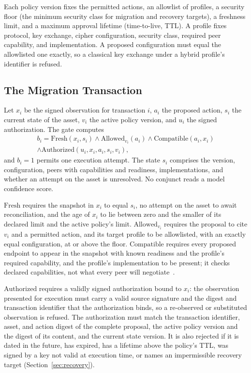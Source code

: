 \documentclass[journal]{IEEEtran}
\newcommand{\Fresh}{\mathrm{Fresh}}
\newcommand{\Allowed}{\mathrm{Allowed}}
\newcommand{\Compatible}{\mathrm{Compatible}}
\newcommand{\Authorized}{\mathrm{Authorized}}
\begin{document}
Each policy version fixes the permitted actions, an allowlist of profiles, a security floor (the minimum security class for migration and recovery targets), a freshness limit, and a maximum approval lifetime (time-to-live, TTL). A profile fixes protocol, key exchange, cipher configuration, security class, required peer capability, and implementation. A proposed configuration must equal the allowlisted one exactly, so a classical key exchange under a hybrid profile's identifier is refused.

\subsection{The Migration Transaction}
\label{sec:txn}
Let $x_i$ be the signed observation for transaction $i$, $a_i$ the proposed action, $s_i$ the current state of the asset, $v_i$ the active policy version, and $u_i$ the signed authorization. The gate computes
\begin{multline}
\label{eq:gate}
b_i = \Fresh(x_i,s_i) \wedge \Allowed_{v_i}(a_i) \wedge \Compatible(a_i,x_i) \\
\wedge \Authorized(u_i,x_i,a_i,s_i,v_i),
\end{multline}
and $b_i=1$ permits one execution attempt. The state $s_i$ comprises the version, configuration, peers with capabilities and readiness, implementations, and whether an attempt on the asset is unresolved. No conjunct reads a model confidence score.

$\Fresh$ requires the snapshot in $x_i$ to equal $s_i$, no attempt on the asset to await reconciliation, and the age of $x_i$ to lie between zero and the smaller of its declared limit and the active policy's limit. $\Allowed_{v_i}$ requires the proposal to cite $v_i$ and a permitted action, and its target profile to be allowlisted, with an exactly equal configuration, at or above the floor. $\Compatible$ requires every proposed endpoint to appear in the snapshot with known readiness and the profile's required capability, and the profile's implementation to be present; it checks declared capabilities, not what every peer will negotiate~\cite{han}.

$\Authorized$ requires a validly signed authorization bound to $x_i$: the observation presented for execution must carry a valid source signature and the digest and transaction identifier that the authorization binds, so a re-observed or substituted observation is refused. The authorization must match the transaction identifier, asset, and action digest of the complete proposal, the active policy version and the digest of its content, and the current state version. It is also rejected if it is dated in the future, has expired, has a lifetime above the policy's TTL, was signed by a key not valid at execution time, or names an impermissible recovery target (Section~\ref{sec:recovery}).
\end{document}
